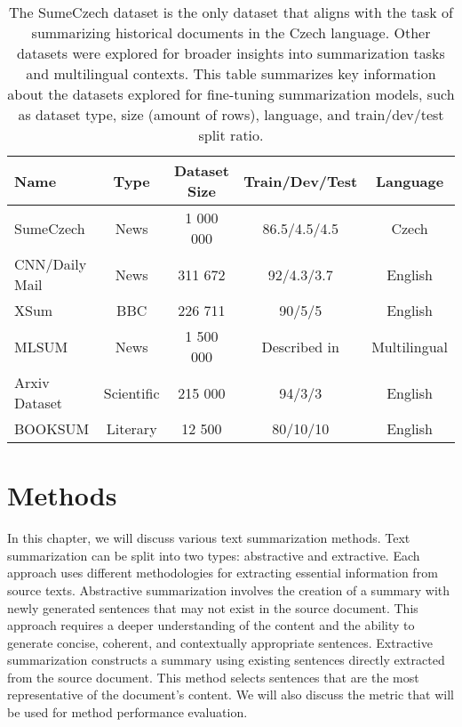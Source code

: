 \documentclass[english, ba, kiv, he, iso690numb, pdf, viewonly]{fasthesis}
\begin{document}
\begin{table}[htbp]
    \centering
    \captionsetup{font=scriptsize}
    \caption{The SumeCzech dataset is the only dataset that aligns with the task of summarizing historical documents in the Czech language. Other datasets were explored for broader insights into summarization tasks and multilingual contexts. This table summarizes key information about the datasets explored for fine-tuning summarization models, such as dataset type, size (amount of rows), language, and train/dev/test split ratio.}
    \label{tab:datasets}
    \begin{tabular}{lcccc}
        \toprule
        \textbf{Name} & \textbf{Type} & \textbf{Dataset Size} & \textbf{Train/Dev/Test} & \textbf{Language} \\
        \midrule
        SumeCzech & News & 1 000 000 & 86.5/4.5/4.5 & Czech \\
        CNN/Daily Mail & News & 311 672 & 92/4.3/3.7 & English \\
        XSum & BBC & 226 711 & 90/5/5 & English \\
        MLSUM & News & 1 500 000 & Described in \cite{scialom2020mlsum} & Multilingual \\
        Arxiv Dataset & Scientific & 215 000 & 94/3/3 & English \\
        BOOKSUM & Literary & 12 500 & 80/10/10 & English \\
        \bottomrule
    \end{tabular}
\end{table}


%
%
%
%
\chapter{Methods} \label{methods}
In this chapter, we will discuss various text summarization methods.  
Text summarization can be split into two types: abstractive and extractive. Each approach uses different methodologies for extracting essential information from source texts. Abstractive summarization involves the creation of a summary with newly generated sentences that may not exist in the source document. This approach requires a deeper understanding of the content and the ability to generate concise, coherent, and contextually appropriate sentences. Extractive summarization constructs a summary using existing sentences directly extracted from the source document. This method selects sentences that are the most representative of the document's content. We will also discuss the metric that will be used for method performance evaluation.
\end{document}

